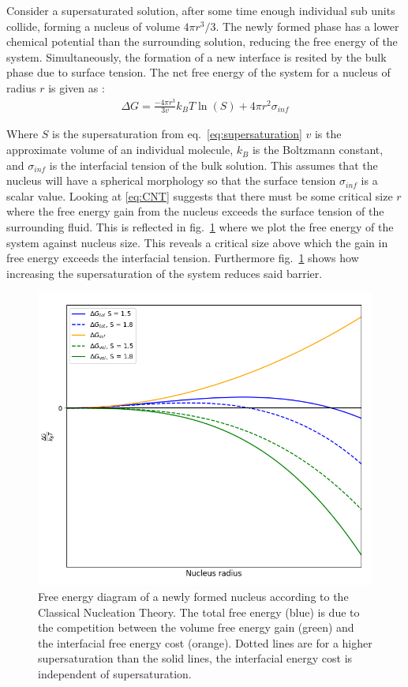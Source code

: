 Consider a supersaturated solution, after some time 
enough individual sub units collide, forming a nucleus 
of volume $4\pi r^3/3$. The newly formed phase has a 
lower chemical potential than the surrounding solution, 
reducing the free energy of the system. Simultaneously, 
the formation of a new interface is resited by the bulk 
phase due to surface tension. The net free energy of the 
system for a nucleus of radius $r$ is given as \cite{Karthika2016}:
\begin{align}
	\Delta G = \frac{-4\pi r^3}{3v}k_BT\ln(S) + 4\pi r^{2}\sigma_{inf}
	\label{eq:CNT} 
\end{align}

Where $S$ is the supersaturation from eq.~\eqref{eq:supersaturation} 
$v$ is the approximate volume of an individual molecule, 
$k_B$ is the Boltzmann constant, and $\sigma_{inf}$ is the 
interfacial tension of the bulk solution. This assumes that 
the nucleus will have a spherical morphology so that the 
surface tension $\sigma_{inf}$ is a scalar value. Looking at 
\eqref{eq:CNT} suggests that there must be some critical size 
$r$ where the free energy gain from the nucleus exceeds the 
surface tension of the surrounding fluid. This is reflected in 
fig.~\ref{fig:free_energy} where we plot the free energy of the 
system against nucleus size. This reveals a critical size above 
which the gain in free energy exceeds the interfacial tension. 
Furthermore fig.~\ref{fig:free_energy} shows how increasing the 
supersaturation of the system reduces said barrier. 
\begin{figure}[h!]
	\centering
	\includegraphics[width=\linewidth]{Free_Energy_Diagram.png}
	\caption{Free energy diagram of a newly formed nucleus according 
		     to the Classical Nucleation Theory. The total free energy (blue)
		     is due to the competition between the volume free energy gain
		     (green) and the interfacial free energy cost (orange). Dotted
		     lines are for a higher supersaturation than the solid lines,
		     the interfacial energy cost is independent of supersaturation.}
	\label{fig:free_energy}
\end{figure}

